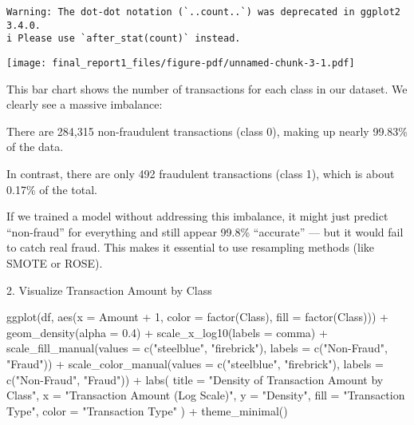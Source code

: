 \documentclass[
  11pt,
  letterpaper,
  DIV=11,
  numbers=noendperiod]{scrartcl}
\newenvironment{Shaded}{}{}
\newcommand{\AttributeTok}[1]{\textcolor[rgb]{0.84,0.23,0.29}{#1}}
\newcommand{\DecValTok}[1]{\textcolor[rgb]{0.00,0.36,0.77}{#1}}
\newcommand{\FloatTok}[1]{\textcolor[rgb]{0.00,0.36,0.77}{#1}}
\newcommand{\FunctionTok}[1]{\textcolor[rgb]{0.44,0.26,0.76}{#1}}
\newcommand{\NormalTok}[1]{\textcolor[rgb]{0.14,0.16,0.18}{#1}}
\newcommand{\SpecialCharTok}[1]{\textcolor[rgb]{0.00,0.36,0.77}{#1}}
\newcommand{\StringTok}[1]{\textcolor[rgb]{0.01,0.18,0.38}{#1}}
\begin{document}
\begin{verbatim}
Warning: The dot-dot notation (`..count..`) was deprecated in ggplot2 3.4.0.
i Please use `after_stat(count)` instead.
\end{verbatim}

\texttt{[image: final\_report1\_files/figure-pdf/unnamed-chunk-3-1.pdf]}

This bar chart shows the number of transactions for each class in our
dataset. We clearly see a massive imbalance:

There are 284,315 non-fraudulent transactions (class 0), making up
nearly 99.83\% of the data.

In contrast, there are only 492 fraudulent transactions (class 1), which
is about 0.17\% of the total.

If we trained a model without addressing this imbalance, it might just
predict ``non-fraud'' for everything and still appear 99.8\%
``accurate'' --- but it would fail to catch real fraud. This makes it
essential to use resampling methods (like SMOTE or ROSE).

2. Visualize Transaction Amount by Class

\begin{Shaded}
\begin{Highlighting}[]
\FunctionTok{ggplot}\NormalTok{(df, }\FunctionTok{aes}\NormalTok{(}\AttributeTok{x =}\NormalTok{ Amount }\SpecialCharTok{+} \DecValTok{1}\NormalTok{, }\AttributeTok{color =} \FunctionTok{factor}\NormalTok{(Class), }\AttributeTok{fill =} \FunctionTok{factor}\NormalTok{(Class))) }\SpecialCharTok{+}
  \FunctionTok{geom\_density}\NormalTok{(}\AttributeTok{alpha =} \FloatTok{0.4}\NormalTok{) }\SpecialCharTok{+}
  \FunctionTok{scale\_x\_log10}\NormalTok{(}\AttributeTok{labels =}\NormalTok{ comma) }\SpecialCharTok{+}
  \FunctionTok{scale\_fill\_manual}\NormalTok{(}\AttributeTok{values =} \FunctionTok{c}\NormalTok{(}\StringTok{"steelblue"}\NormalTok{, }\StringTok{"firebrick"}\NormalTok{), }\AttributeTok{labels =} \FunctionTok{c}\NormalTok{(}\StringTok{"Non{-}Fraud"}\NormalTok{, }\StringTok{"Fraud"}\NormalTok{)) }\SpecialCharTok{+}
  \FunctionTok{scale\_color\_manual}\NormalTok{(}\AttributeTok{values =} \FunctionTok{c}\NormalTok{(}\StringTok{"steelblue"}\NormalTok{, }\StringTok{"firebrick"}\NormalTok{), }\AttributeTok{labels =} \FunctionTok{c}\NormalTok{(}\StringTok{"Non{-}Fraud"}\NormalTok{, }\StringTok{"Fraud"}\NormalTok{)) }\SpecialCharTok{+}
  \FunctionTok{labs}\NormalTok{(}
    \AttributeTok{title =} \StringTok{"Density of Transaction Amount by Class"}\NormalTok{,}
    \AttributeTok{x =} \StringTok{"Transaction Amount (Log Scale)"}\NormalTok{,}
    \AttributeTok{y =} \StringTok{"Density"}\NormalTok{,}
    \AttributeTok{fill =} \StringTok{"Transaction Type"}\NormalTok{,}
    \AttributeTok{color =} \StringTok{"Transaction Type"}
\NormalTok{  ) }\SpecialCharTok{+}
  \FunctionTok{theme\_minimal}\NormalTok{()}
\end{Highlighting}
\end{Shaded}
\end{document}
